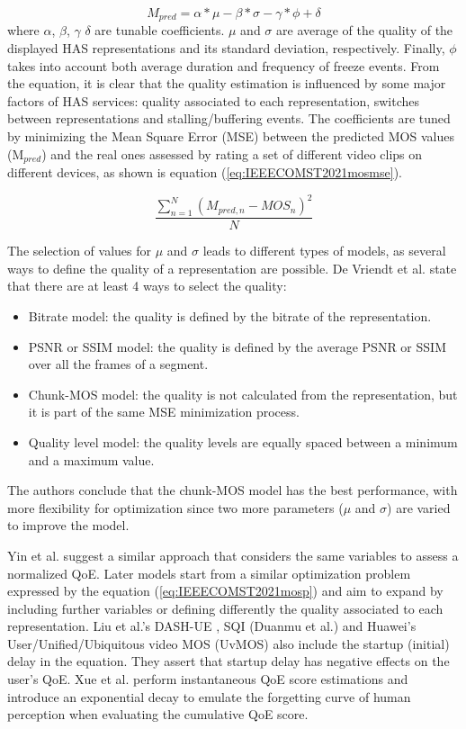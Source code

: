 \begin{equation}
	\label{eq:IEEECOMST2021mosp}
	M_{pred} = \alpha*\mu - \beta*\sigma - \gamma*\phi + \delta
\end{equation}
where $\alpha$, $\beta$, $\gamma$ $\delta$ are tunable coefficients. $\mu$ and $\sigma$ are average of the quality of the displayed HAS representations and its standard deviation, respectively. Finally, $\phi$ takes into account both average duration and frequency of freeze events. From the equation, it is clear that the quality estimation is influenced by some major factors of HAS services: quality associated to each representation, switches between representations and stalling/buffering events. The coefficients are tuned by minimizing the Mean Square Error (MSE) between the predicted MOS values (M$_{pred}$) and the real ones assessed by rating a set of different video clips on different devices, as shown is equation (\ref{eq:IEEECOMST2021mosmse}).

\begin{equation}
	\label{eq:IEEECOMST2021mosmse}
	\frac{\sum\limits_{n=1}^{N} (M_{pred,n} - MOS_n)^2}{N}
\end{equation}

The selection of values for $\mu$ and $\sigma$ leads to different types of models, as several ways to define the quality of a representation are possible. De Vriendt et al. \cite{DeVriendt2013} state that there are at least 4 ways to select the quality:

\begin{itemize}
	\item Bitrate model: the quality is defined by the bitrate of the representation.
	\item PSNR or SSIM model: the quality is defined by the average PSNR or SSIM over all the frames of a segment.
	\item Chunk-MOS model: the quality is not calculated from the representation, but it is part of the same MSE minimization process.
	\item Quality level model: the quality levels are equally spaced between a minimum and a maximum value.
\end{itemize}
The authors conclude that the chunk-MOS model has the best performance, with more flexibility for optimization since two more parameters ($\mu$ and $\sigma$) are varied to improve the model.

Yin et al. \cite{Yin2014} suggest a similar approach that considers the same variables to assess a normalized QoE. Later models start from a similar optimization problem expressed by the equation (\ref{eq:IEEECOMST2021mosp}) and aim to expand by including further variables or defining differently the quality associated to each representation. Liu et al.'s DASH-UE \cite{Liu2015}, SQI (Duanmu et al.) \cite{Duanmu2016} and Huawei's User/Unified/Ubiquitous video MOS (UvMOS) \cite{Huawei2016} also include the startup (initial) delay in the equation. They assert that startup delay has negative effects on the user's QoE. Xue et al. \cite{Xue2014} perform instantaneous QoE score estimations and introduce an exponential decay to emulate the forgetting curve of human perception when evaluating the cumulative QoE score.

